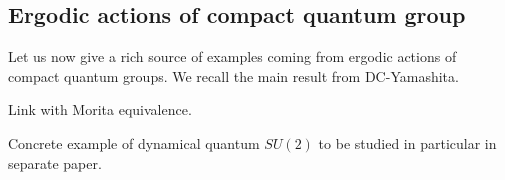 

\subsection{Ergodic actions of compact quantum group}

Let us now give a rich source of examples coming from ergodic actions of compact quantum groups. We recall the main result from DC-Yamashita.

Link with Morita equivalence. 

Concrete example of dynamical quantum $SU(2)$ to be studied in particular in separate paper. 









